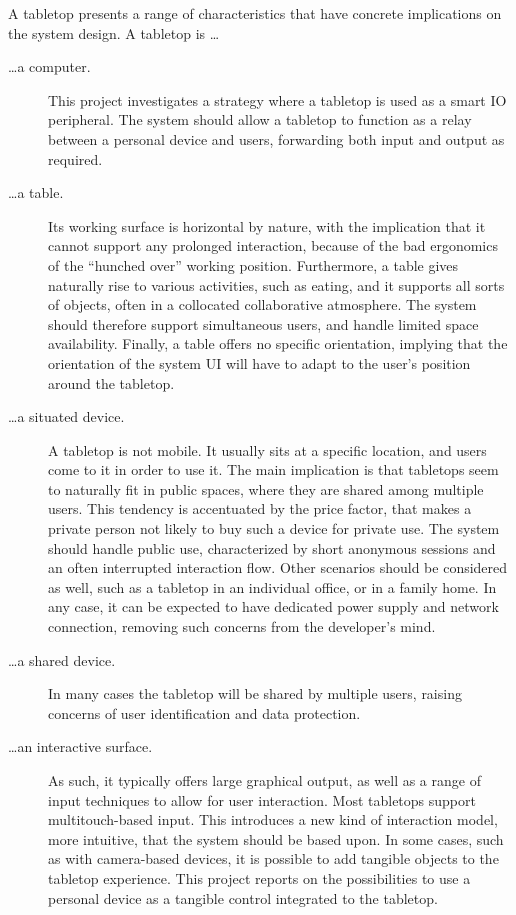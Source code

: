 A tabletop presents a range of characteristics that have concrete implications on the system design.
A tabletop is \ldots
\begin{description}

\item[\ldots a computer.] This project investigates a strategy where a tabletop is used as a smart IO peripheral.
The system should allow a tabletop to function as a relay between a personal device and users, forwarding both input and output as required.

\item[\ldots a table.] Its working surface is horizontal by nature, with the implication that it cannot support any prolonged interaction, because of the bad ergonomics of the ``hunched over'' working position.
Furthermore, a table gives naturally rise to various activities, such as eating, and it supports all sorts of objects, often in a collocated collaborative atmosphere.
The system should therefore support simultaneous users, and handle limited space availability.
Finally, a table offers no specific orientation, implying that the orientation of the system UI will have to adapt to the user's position around the tabletop.

\item[\ldots a situated device.] A tabletop is not mobile.
It usually sits at a specific location, and users come to it in order to use it.
The main implication is that tabletops seem to naturally fit in public spaces, where they are shared among multiple users.
This tendency is accentuated by the price factor, that makes a private person not likely to buy such a device for private use.
The system should handle public use, characterized by short anonymous sessions and an often interrupted interaction flow.
Other scenarios should be considered as well, such as a tabletop in an individual office, or in a family home.
In any case, it can be expected to have dedicated power supply and network connection, removing such concerns from the developer's mind.

\item[\ldots a shared device.] In many cases the tabletop will be shared by multiple users, raising concerns of user identification and data protection.

\item[\ldots an interactive surface.] As such, it typically offers large graphical output, as well as a range of input techniques to allow for user interaction.
Most tabletops support multitouch-based input.
This introduces a new kind of interaction model, more intuitive, that the system should be based upon.
In some cases, such as with camera-based devices, it is possible to add tangible objects to the tabletop experience.
This project reports on the possibilities to use a personal device as a tangible control integrated to the tabletop.

\end{description}

